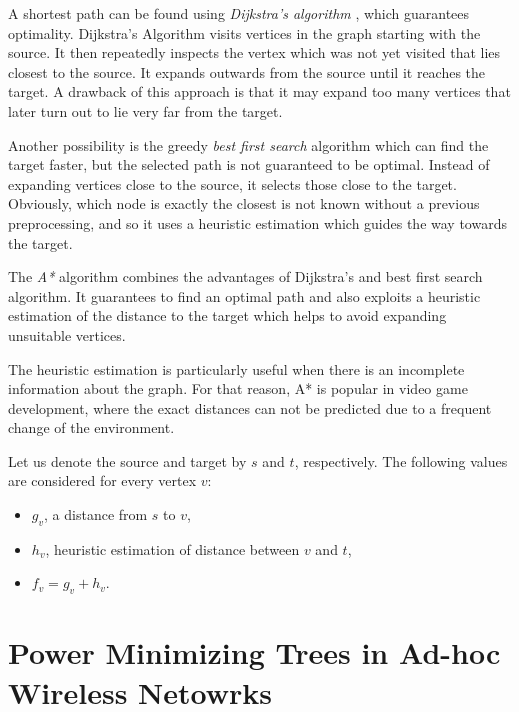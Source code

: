 A shortest path can be found using \emph{Dijkstra's algorithm} \cite{dijkstra59}, which guarantees optimality.
Dijkstra’s Algorithm visits vertices in the graph starting with the source. 
It then repeatedly inspects the vertex which was not yet visited that lies closest to the source. 
It expands outwards from the source until it reaches the target. 
A drawback of this approach is that it may expand too many vertices that later turn out to lie very far from the target.


Another possibility is the greedy \emph{best first search} algorithm which can find the target faster, but the selected path is not guaranteed to be optimal.
Instead of expanding vertices close to the source, it selects those close to the target.
Obviously, which node is exactly the closest is not known without a previous preprocessing, and so it uses a heuristic estimation which guides the way towards the target.


The \emph{A*} algorithm combines the advantages of Dijkstra's and best first search algorithm.
It guarantees to find an optimal path and also exploits a heuristic estimation of the distance to the target which helps to avoid expanding unsuitable vertices.

The heuristic estimation is particularly useful when there is an incomplete information about the graph.
For that reason, A* is popular in video game development, where the exact distances can not be predicted due to a frequent change of the environment. 

Let us denote the source and target by $s$ and $t$, respectively.
The following values are considered for every vertex $v$:
\begin{itemize}
	\item $g_v$, a distance from $s$ to $v$,
	\item $h_v$, heuristic estimation of distance between $v$ and $t$, 
	\item $f_v=g_v+h_v$.
\end{itemize}


\section{Power Minimizing Trees in Ad-hoc Wireless Netowrks}\label{sec:smt}

